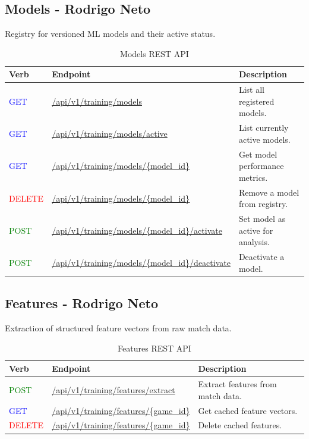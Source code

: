 \documentclass[11pt,a4paper]{article}
\newcommand{\postapi}{\textcolor{green}{POST}}
\newcommand{\getapi}{\textcolor{blue}{GET}}
\newcommand{\deleteapi}{\textcolor{red}{DELETE}}
\newcommand{\training}[1]{/api/v1/training#1}
\newcommand{\bff}[1]{\textbf{#1}}
\begin{document}
 \newpage
 \subsection{Models - Rodrigo Neto}

 Registry for versioned ML models and their active status.

 \begin{table}[H]
 \begin{tabular}{|p{2cm}|p{5cm}|p{7cm}|}
 \hline
 \bff{Verb} & \bff{Endpoint}        & \bff{Description} \\ \hline
 \getapi & \url{\training/models}      & List all registered models. \\ \hline
 \getapi & \url{\training/models/active}     & List currently active models. \\ \hline
 \getapi & \url{\training/models/{model\_id}}   & Get model performance metrics. \\ \hline
 \deleteapi & \url{\training/models/{model\_id}}   & Remove a model from registry. \\ \hline
 \postapi & \url{\training/models/{model\_id}/activate} & Set model as active for analysis. \\ \hline
 \postapi & \url{\training/models/{model\_id}/deactivate} & Deactivate a model. \\ \hline
 \end{tabular}
 \caption{Models REST API}
 \label{tab:api-models}
 \end{table}

 \subsection{Features - Rodrigo Neto}

 Extraction of structured feature vectors from raw match data.

 \begin{table}[H]
 \begin{tabular}{|p{2cm}|p{5cm}|p{7cm}|}
 \hline
 \bff{Verb} & \bff{Endpoint}       & \bff{Description} \\ \hline
 \postapi & \url{\training/features/extract} & Extract features from match data. \\ \hline
 \getapi & \url{\training/features/{game\_id}} & Get cached feature vectors. \\ \hline
 \deleteapi & \url{\training/features/{game\_id}} & Delete cached features. \\ \hline
 \end{tabular}
 \caption{Features REST API}
 \label{tab:api-features}
 \end{table}
\end{document}
